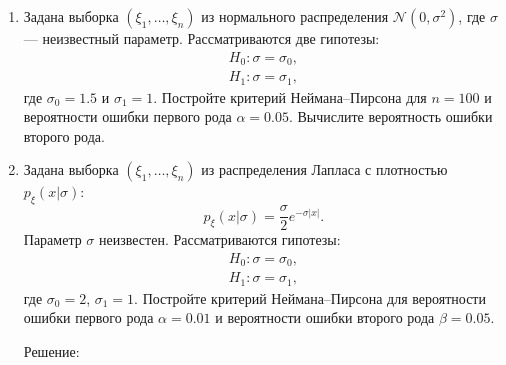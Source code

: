 \documentclass[a4paper,12pt]{article}
\newcommand{\modulus}[1]{\left | #1 \right |}
\begin{document}
\begin{enumerate}
      \item Задана выборка $\left( \xi_1, \dots, \xi_n \right)$ из нормального распределения $\mathcal{N}(0, \sigma^2)$, где $\sigma$ --- неизвестный
            параметр. Рассматриваются две гипотезы:
            \begin{gather*}
                  H_0: \sigma = \sigma_0 , \\
                  H_1: \sigma = \sigma_1 ,
            \end{gather*}
            где $\sigma_0 = 1.5$ и $\sigma_1 = 1$. Постройте критерий Неймана--Пирсона для $n = 100$ и вероятности ошибки первого рода $\alpha = 0.05$.
            Вычислите вероятность ошибки второго рода.

      \item Задана выборка $\left( \xi_1, \dots, \xi_n \right)$ из распределения Лапласа с плотностью $p_\xi(x | \sigma)$:
            \[
                  p_\xi(x | \sigma)
                  = \frac{\sigma}{2} e^{- \sigma \modulus{x}} .
            \]
            Параметр $\sigma$ неизвестен. Рассматриваются гипотезы:
            \begin{gather*}
                  H_0: \sigma = \sigma_0 , \\
                  H_1: \sigma = \sigma_1 ,
            \end{gather*}
            где $\sigma_0 = 2$, $\sigma_1 = 1$. Постройте критерий Неймана--Пирсона для вероятности ошибки первого рода $\alpha = 0.01$ и вероятности
            ошибки второго рода $\beta = 0.05$.

            Решение:


\end{enumerate}
\end{document}
